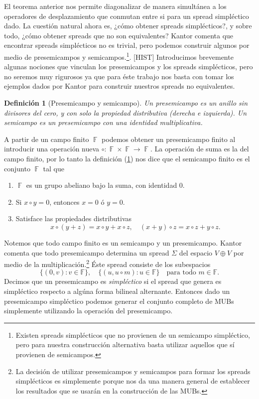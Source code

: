 \documentclass[a4paper]{report}
\DeclareMathOperator{\F}{\mathbb{F}}
\newtheorem{definition}{Definición}
\begin{document}
  El teorema anterior nos permite diagonalizar de manera
  simultánea a los operadores de desplazamiento que conmutan
  entre si para un spread simpléctico dado.  La cuestión
  natural ahora es, ¿cómo obtener spreads simplécticos?, y
  sobre todo, ¿cómo obtener spreads que no son equivalentes?
  Kantor comenta que encontrar spreads simplécticos no es
  trivial, pero podemos construir algunos por medio de
  presemicampos y semicampos.\footnote{Existen spreads
    simplécticos que no provienen de un semicampo
    simpléctico, pero para nuestra construcción alternativa
  basta utilizar aquellos que sí provienen de semicampos.}.
  [HIST] Introducimos brevemente algunas nociones que
  vinculan los presemicampos y los spreads simplécticos,
  pero no seremos muy rigurosos ya que para éste trabajo nos
  basta con tomar los ejemplos dados por Kantor
  \cite{kantor2012} para construir nuestros spreads no
  equivalentes.
  \begin{definition}[Presemicampo y semicampo]
    \label{def:presemifield}
    Un presemicampo es un anillo sin divisores del cero, y
    con solo la propiedad distributiva (derecha e
    izquierda). Un semicampo es un presemicampo con una
    identidad multiplicativa.
  \end{definition}
  A partir de un campo finito $\F$ podemos obtener un
  presemicampo finito al introducir una operación nueva
  $\circ : \F \times \F \to \F$. La operación de suma es la
  del campo finito, por lo tanto la definición
  (\ref{def:presemifield}) nos dice que el semicampo finito
  es el conjunto $\F$ tal que
  \begin{enumerate}
    \item $\F$ es un grupo abeliano bajo la suma, con
      identidad $0$.
    \item Si $x \circ y = 0$, entonces $x = 0$ ó $y = 0$.
    \item Satisface las propiedades distributivas
      \[
        x \circ (y + z) = x \circ y + x \circ z,
        \quad
        (x + y) \circ z = x \circ z + y \circ z.
      \] 
  \end{enumerate}
  Notemos que todo campo finito es un semicampo y un
  presemicampo. Kantor comenta que todo presemicampo
  determina un spread $\Sigma$ del espacio $V \oplus V$ por
  medio de la multiplicación.\footnote{La decisión de
    utilizar presemicampos y semicampos para formar los
    spreads simplécticos es simplemente porque nos da una
    manera general de establecer los resultados que se
    usarán en la
  construcción de las MUBs.} Éste spread consiste de los
  subespacios
  \begin{equation}
    \label{eqn:presemi_spread}
    \{(0,v) : v \in \mathbb F\},
    \quad 
    \{(u, u \circ m) : u \in \mathbb F\}
    \quad
    \text{para todo } m \in \mathbb F.
  \end{equation}
  Decimos que un presemicampo es \textit{simpléctico} si el
  spread que genera es simpléctico respecto a
  algúna forma bilineal alternante. Entonces dado un
  presemicampo simpléctico podemos generar el conjunto
  completo de MUBs simplemente utilizando la operación del
  presemicampo.
\end{document}
